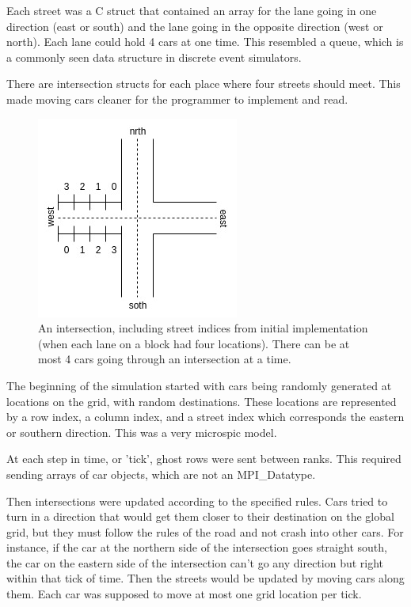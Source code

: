 \documentclass[10pt,a4paper]{article}
\begin{document}
    Each street was a C struct that contained an array for the lane going in one direction (east or south) and the lane going in the opposite direction (west or north). Each lane could hold 4 cars at one time. This resembled a queue, which is a commonly seen data structure in discrete event simulators.
    
    There are intersection structs for each place where four streets should meet. This made moving cars cleaner for the programmer to implement and read.
    
    \begin{figure}
        \centering
        \includegraphics[scale=0.6]{parallel2.jpg}
        \caption{An intersection, including street indices from initial implementation (when each lane on a block had four locations). There can be at most 4 cars going through an intersection at a time.}
        \label{fig:my_label}
    \end{figure}
    
    The beginning of the simulation started with cars being randomly generated at locations on the grid, with random destinations. These locations are represented by a row index, a column index, and a street index which corresponds the eastern or southern direction. This was a very microspic model. 
    
    At each step in time, or 'tick', ghost rows were sent between ranks. This required sending arrays of car objects, which are not an MPI\_Datatype.
    
    Then intersections were updated according to the specified rules. Cars tried to turn in a direction that would get them closer to their destination on the global grid, but they must follow the rules of the road and not crash into other cars. For instance, if the car at the northern side of the intersection goes straight south, the car on the eastern side of the intersection can't go any direction but right within that tick of time. Then the streets would be updated by moving cars along them. Each car was supposed to move at most one grid location per tick.
    
\end{document}
